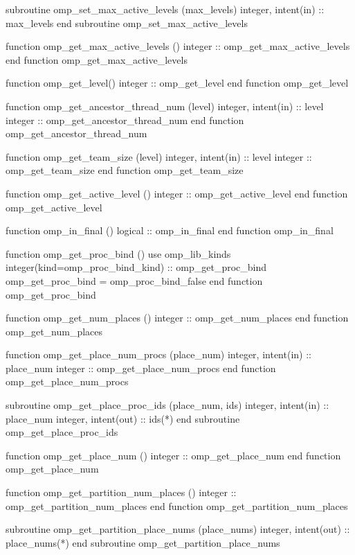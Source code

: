 {\begin{ompfFunction}
          subroutine omp_set_max_active_levels (max_levels)
           integer, intent(in) :: max_levels
          end subroutine omp_set_max_active_levels

          function omp_get_max_active_levels ()
           integer :: omp_get_max_active_levels
          end function omp_get_max_active_levels

          function omp_get_level()
           integer :: omp_get_level
          end function omp_get_level

          function omp_get_ancestor_thread_num (level)
           integer, intent(in) :: level
           integer :: omp_get_ancestor_thread_num
          end function omp_get_ancestor_thread_num

          function omp_get_team_size (level)
           integer, intent(in) :: level
           integer :: omp_get_team_size
          end function omp_get_team_size

          function omp_get_active_level ()
           integer :: omp_get_active_level
          end function omp_get_active_level

          function omp_in_final ()
           logical :: omp_in_final
          end function omp_in_final

          function omp_get_proc_bind ()
           use omp_lib_kinds
           integer(kind=omp_proc_bind_kind) :: omp_get_proc_bind
           omp_get_proc_bind = omp_proc_bind_false
          end function omp_get_proc_bind

          function omp_get_num_places ()
           integer :: omp_get_num_places
          end function omp_get_num_places

          function omp_get_place_num_procs (place_num)
           integer, intent(in) :: place_num
           integer :: omp_get_place_num_procs
          end function omp_get_place_num_procs

          subroutine omp_get_place_proc_ids (place_num, ids)
           integer, intent(in) :: place_num
           integer, intent(out) :: ids(*)
          end subroutine omp_get_place_proc_ids

          function omp_get_place_num ()
           integer :: omp_get_place_num
          end function omp_get_place_num

          function omp_get_partition_num_places ()
           integer :: omp_get_partition_num_places
          end function omp_get_partition_num_places

          subroutine omp_get_partition_place_nums (place_nums)
           integer, intent(out) :: place_nums(*)
          end subroutine omp_get_partition_place_nums


\end{ompfFunction}}
